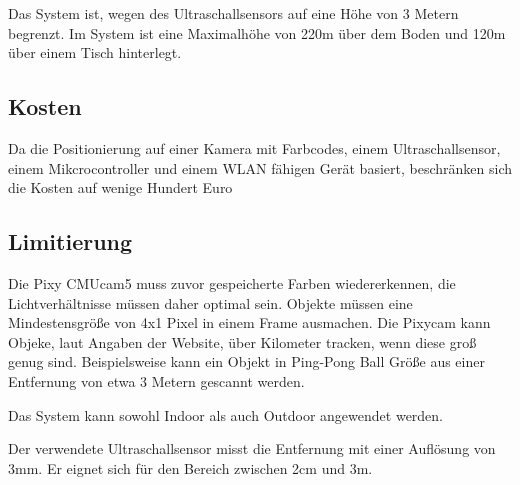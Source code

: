   Das System ist, wegen des Ultraschallsensors auf eine Höhe von 3 Metern begrenzt. Im System ist eine Maximalhöhe von 220m über dem Boden und 120m über einem Tisch hinterlegt.

  \subsection*{Kosten}
  Da  die Positionierung auf einer Kamera mit Farbcodes, einem Ultraschallsensor, einem Mikcrocontroller und einem WLAN fähigen Gerät basiert, beschränken sich die Kosten auf wenige Hundert Euro

  \subsection*{Limitierung}
  Die Pixy CMUcam5 muss zuvor gespeicherte Farben wiedererkennen, die Lichtverhältnisse müssen daher optimal sein.  
  Objekte müssen eine Mindestensgröße von 4x1 Pixel in einem Frame ausmachen. Die Pixycam kann Objeke, laut Angaben der Website, über Kilometer tracken, wenn diese groß genug sind. Beispielsweise kann ein Objekt in Ping-Pong Ball Größe aus einer Entfernung von etwa 3 Metern gescannt werden. \cite{Pixy}

  Das System kann sowohl Indoor als auch Outdoor angewendet werden.

  Der verwendete Ultraschallsensor misst die Entfernung mit einer Auflösung von 3mm. Er eignet sich für den Bereich zwischen 2cm und 3m. \cite{Ultrasonic}

 
